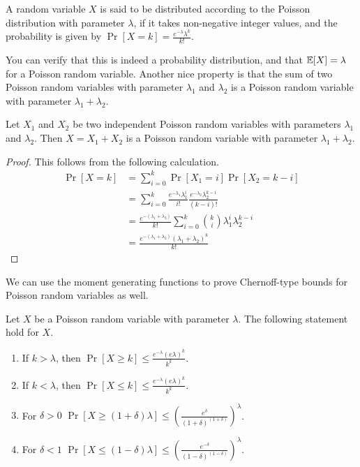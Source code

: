 \begin{definition}
  A random variable $X$ is said to be distributed according to the Poisson
  distribution with parameter $\lambda$, if it takes non-negative integer
  values, and the probability is given by
   $\Pr[X = k] = \frac{e^{-\lambda} \lambda^k}{k!}$.
  \label{defn:poisson}
\end{definition}

You can verify that this is indeed a probability distribution, and that
$\mathbb{E}[X] = \lambda$ for a Poisson random variable. Another nice property is that
the sum of two Poisson random variables with parameter $\lambda_1$ and
$\lambda_2$ is a Poisson random variable with parameter $\lambda_1 + \lambda_2$.
\begin{lemma}
  Let $X_1$ and $X_2$ be two independent Poisson random variables with parameters
  $\lambda_1$ and $\lambda_2$. Then $X = X_1 + X_2$ is a Poisson random variable
  with parameter $\lambda_1 + \lambda_2$.
  \label{lem:sum-poisson}
\end{lemma}
\begin{proof}
  This follows from the following calculation.
  \begin{align*}
    \Pr[X = k] &= \sum_{i=0}^k \Pr[X_1 = i] \Pr[X_2 = k-i]\\
               &= \sum_{i=0}^k \frac{e^{-\lambda_1}\lambda_1^{i}}{i!} \frac{e^{-\lambda_2} \lambda_2^{k-i}}{(k-i)!}\\
               &= \frac{e^{-(\lambda_1+\lambda_2)}}{k!}\sum_{i=0}^k \binom{k}{i} \lambda_1^i \lambda_2^{k-i}\\
    &= \frac{e^{-(\lambda_1+\lambda_2)}(\lambda_1 + \lambda_2)^k}{k!}
  \end{align*}
\end{proof}

We can use the moment generating functions to prove Chernoff-type bounds for
Poisson random variables as well.
\begin{theorem}
  Let $X$ be a Poisson random variable with parameter $\lambda$. The following
  statement hold for $X$.
  \begin{enumerate}
  \item If $k > \lambda$, then $\Pr[X \geq k] \leq \frac{e^{-\lambda}(e\lambda)^k}{k^k}$.
  \item If $k < \lambda$, then $\Pr[X \leq k] \leq \frac{e^{-\lambda}(e\lambda)^k}{k^k}$.
  \item For $\delta > 0$ $\Pr[X \geq (1+\delta)\lambda] \leq \left(\frac{e^\delta}{(1+\delta)^{(1+\delta)}} \right)^\lambda$.
  \item For $\delta < 1$ $\Pr[X \leq (1-\delta)\lambda] \leq \left(\frac{e^{-\delta}}{(1-\delta)^{(1-\delta)}} \right)^\lambda$.
  \end{enumerate}
  \label{thm:poi-chernoff}
\end{theorem}

